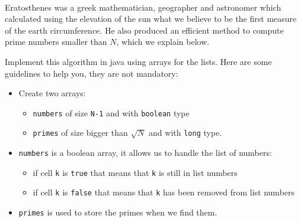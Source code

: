 \documentclass{exercices}
\renewcommand{\|}{\url|}
\begin{document}
\begin{exercice}\\
Eratosthenes was a greek mathematician, geographer and astronomer which calculated using the
elevation of the sun what we believe to be the first measure of the earth circumference.
He also produced an efficient method to compute prime numbers smaller than $N$, which we
explain below.
\begin{center}
\end{center}

Implement this algorithm in java using arrays for the lists. Here are some guidelines to
help you, they are not mandatory:
\begin{itemize}
\item Create two arrays:
\begin{itemize}
\item \verb!numbers! of size \verb!N-1! and with \verb!boolean! type
\item \verb!primes! of size bigger than $\sqrt{N}$ and with \verb!long! type.
\end{itemize}
\item \verb!numbers! is a boolean array, it allows us to handle the list of numbers:
\begin{itemize}
\item if cell \verb!k! is \verb!true! that means that \verb!k! is still in list numbers
\item if cell \verb!k! is \verb!false! that means that \verb!k! has been removed from list numbers
\end{itemize}
\item \verb!primes! is used to store the primes when we find them.
\end{itemize}
\end{exercice}
\end{document}
